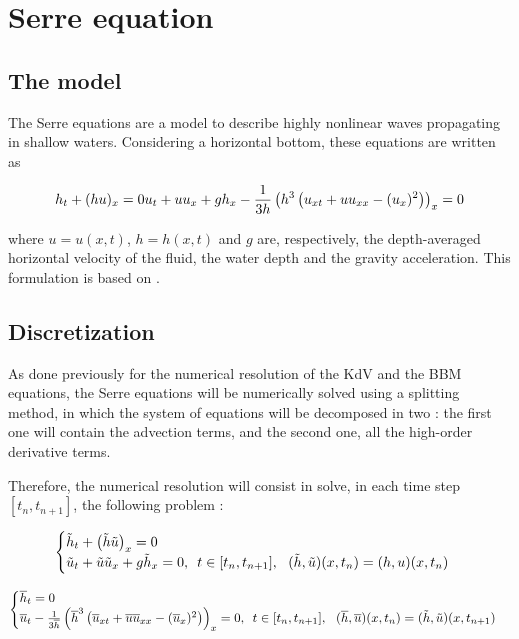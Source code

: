 \section{Serre equation}
\label{sec:Serre}

\subsection{The model}

\indent The Serre equations are a model to describe highly nonlinear waves propagating in shallow waters. Considering a horizontal bottom, these equations are written as

\begin{equation}
\label{eq:SerreFull}
h_t + (hu)_x = 0 \\
u_t + uu_x + gh_x - \frac{1}{3h}\left(h^3 \left( u_{xt} + uu_{xx} - (u_x)^2  \right) \right)_x = 0
\end{equation}

\noindent where $u = u(x,t)$, $h = h(x,t)$ and $g$ are, respectively, the depth-averaged horizontal velocity of the fluid, the water depth and the gravity acceleration. This formulation is based on \cite{CarterCienfuegos2011}.

\subsection{Discretization}

\indent As done previously for the numerical resolution of the KdV and the BBM equations, the Serre equations will be numerically solved using a splitting method, in which the system of equations will be decomposed in two : the first one will contain the advection terms, and the second one, all the high-order derivative terms.

\indent Therefore, the numerical resolution will consist in solve, in each time step $[t_n, t_{n+1}]$, the following problem :

\begin{equation}
\label{eq:SerreSplit1}
\begin{cases}
\th_t + \left(\th\tu\right)_x = 0 \\
\tu_t + \tu\tu_x + g\th_x = 0, \ \, t \in [t_n, t_{n+1}], \ \  (\th,\tu)(x,t_n) = (h,u)(x,t_n)
\end{cases}
\end{equation}

\begin{equation}
\label{eq:SerreSplit2}
\begin{cases}
\lh_t   = 0 \\
\lu_t - \frac{1}{3\lh}\left(\lh^3 \left( \lu_{xt} + \lu\lu_{xx} - (\lu_x)^2  \right) \right)_x = 0, \ \, t \in [t_n, t_{n+1}], \ \  (\lh,\lu)(x,t_n) = (\th,\tu)(x,t_{n+1})
\end{cases}
\end{equation}


